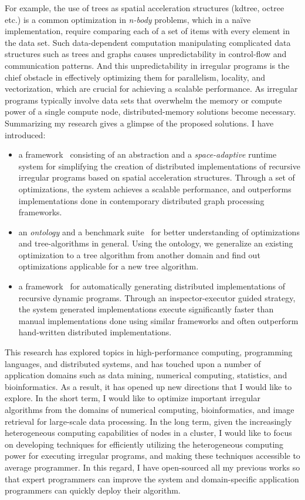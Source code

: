 For example, the use of trees as spatial acceleration structures (kdtree, octree etc.) is a common optimization in {\em n-body} problems, which in a na\"ive implementation, require comparing each of a set of items with every element in the data set. 
Such data-dependent computation manipulating complicated data structures such as trees and graphs causes unpredictability in control-flow and communication patterns. 
And this unpredictability in irregular programs is the chief obstacle in effectively optimizing them for parallelism, locality, and vectorization, which are crucial for achieving a scalable performance. 
As irregular programs typically involve data sets that overwhelm the memory or compute power of a single compute node, distributed-memory solutions become necessary. 
Summarizing my research gives a glimpse of the proposed solutions. I have introduced:
\begin{itemize}
\item a framework~\cite{hegde17ics} consisting of an abstraction and a {\em space-adaptive} runtime system for simplifying the creation of distributed implementations of recursive irregular programs based on spatial acceleration structures. Through a set of optimizations, the system achieves a scalable performance, and outperforms implementations done in contemporary distributed graph processing frameworks.
\item an {\em ontology} and a benchmark suite~\cite{hegde17ispass} for better understanding of optimizations and tree-algorithms in general. Using the ontology, we generalize an existing optimization to a tree algorithm from another domain and find out optimizations applicable for a new tree algorithm.
\item a framework~\cite{hegde19d2p} for automatically generating distributed implementations of recursive dynamic programs. Through an inspector-executor guided strategy, the system generated implementations execute significantly faster than manual implementations done using similar frameworks and often outperform hand-written distributed implementations.
\end{itemize} 
 
This research has explored topics in high-performance computing, programming languages, and distributed systems, and has touched upon a number of application domains such as data mining, numerical computing, statistics, and bioinformatics. 
As a result, it has opened up new directions that I would like to explore. In the short term, I would like to optimize important irregular algorithms from the domains of numerical computing, bioinformatics, and image retrieval for large-scale data processing.
In the long term, given the increasingly heterogeneous computing capabilities of nodes in a cluster, I would like to focus on developing techniques for efficiently utilizing the heterogeneous computing power for executing irregular programs, and making these techniques accessible to average programmer. 
In this regard, I have open-sourced all my previous works so that expert programmers can improve the system and domain-specific application programmers can quickly deploy their algorithm.  

